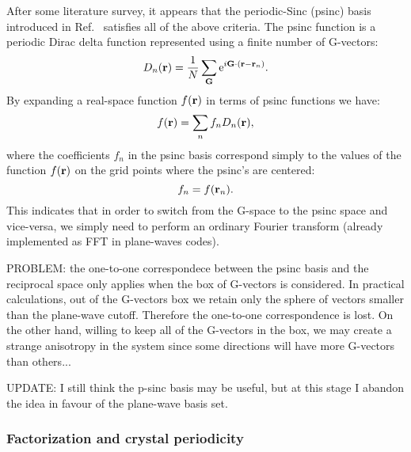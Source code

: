 \documentclass[12pt]{article}
\def\G{{\bf G}}
\def\r{{\bf r}}
\begin{document}
\noindent
After some literature survey, it appears that the periodic-Sinc (psinc) basis introduced in Ref.\ \cite{mostofi}
satisfies all of the above criteria. The psinc function is a periodic Dirac delta function represented using
a finite number of G-vectors:
  \begin{equation}
  D_n(\r) = \frac{1}{N}\sum_{\G} {\rm e}^{i\G\cdot(\r-\r_n)}.
  \end{equation}
By expanding a real-space function $f(\r)$ in terms of psinc functions we have:
  \begin{equation}
  f(\r) = \sum_n f_n D_n(\r),
  \end{equation}
where the coefficients $f_n$ in the psinc basis correspond simply to the values of the function $f(\r)$
on the grid points where the psinc's are centered:
  \begin{equation}
  f_n = f(\r_n). 
  \end{equation}
This indicates that in order to switch from the G-space to the psinc space and vice-versa, 
we simply need to perform an ordinary Fourier transform (already implemented as FFT in plane-waves codes).

\noindent
PROBLEM: the one-to-one correspondece between the psinc basis and the reciprocal space only
applies when the {\entire} box of G-vectors is considered. In practical calculations, out of the
G-vectors box we retain only the sphere of vectors smaller than the plane-wave cutoff.
Therefore the one-to-one correspondence is lost. On the other hand, willing to keep all of
the G-vectors in the box, we may create a strange anisotropy in the system since some directions
will have more G-vectors than others...

\noindent
UPDATE: I still think the p-sinc basis may be useful, but at this stage I abandon
the idea in favour of the plane-wave basis set. 

\subsubsection*{Factorization and crystal periodicity}
\end{document}
